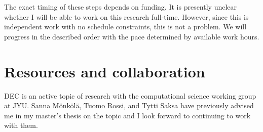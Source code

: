 \documentclass{article}
\begin{document}
The exact timing of these steps depends on funding.
It is presently unclear whether I will be able to work on this research full-time.
However, since this is independent work with no schedule constraints,
this is not a problem.
We will progress in the described order with the pace determined by available work hours.

\section*{Resources and collaboration}

DEC is an active topic of research with the computational science working group at JYU.
Sanna Mönkölä, Tuomo Rossi, and Tytti Saksa
have previously advised me in my master's thesis on the topic
and I look forward to continuing to work with them.

\printbibliography
\end{document}
